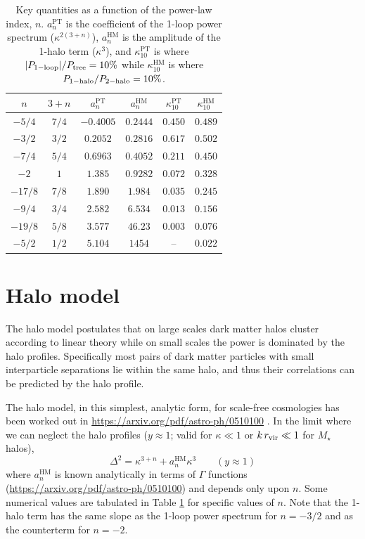 \documentclass{article}
\begin{document}
\begin{table}
    \centering
    \begin{tabular}{cccccc}
    $n$ & $3+n$ & $a_n^\mathrm{PT}$ & $a_n^\mathrm{HM}$ & $\kappa_{10}^\mathrm{PT}$ & $\kappa_{10}^\mathrm{HM}$ \\ \hline
    $-5/4$ & $7/4$ &$-0.4005$ & $0.2444$ & $0.450$ & $0.489$ \\
    $-3/2$ & $3/2$ & $0.2052$ & $0.2816$ & $0.617$ & $0.502$ \\
    $-7/4$ & $5/4$ & $0.6963$ & $0.4052$ & $0.211$ & $0.450$ \\
    $-2$   & $1$   &  $1.385$ & $0.9282$ & $0.072$ & $0.328$ \\
    $-17/8$& $7/8$ &  $1.890$ & $1.984$  & $0.035$ & $0.245$ \\
    $-9/4$ & $3/4$ &  $2.582$ & $6.534$  & $0.013$ & $0.156$ \\
    $-19/8$& $5/8$ &  $3.577$ & $46.23$  & $0.003$ & $0.076$ \\
    $-5/2$ & $1/2$ &  $5.104$ & $1454$   & --      & $0.022$ \\ \hline
    \end{tabular}
    \caption{Key quantities as a function of the power-law index, $n$.  $a_n^\mathrm{PT}$ is the coefficient of the 1-loop power spectrum ($\kappa^{2(3+n)}$), $a_n^\mathrm{HM}$ is the amplitude of the 1-halo term ($\kappa^3$), and $\kappa_{10}^\mathrm{PT}$ is where $|P_{\rm 1-loop}|/P_{\rm tree}=10\%$ while $\kappa_{10}^\mathrm{HM}$ is where $P_{\rm 1-halo}/P_{\rm 2-halo}=10\%$.}
    \label{tab:numbers}
\end{table}

\section{Halo model}

The halo model postulates that on large scales dark matter halos cluster according to linear theory while on small scales the power is dominated by the halo profiles. Specifically most pairs of dark matter particles with small interparticle separations lie within the same halo, and thus their correlations can be predicted by the halo profile.

The halo model, in this simplest, analytic form, for scale-free cosmologies has been worked out in \url{https://arxiv.org/pdf/astro-ph/0510100} .  In the limit where we can neglect the halo profiles ($y\approx 1$; valid for $\kappa\ll 1$ or $k\,r_{\rm vir}\ll 1$ for $M_\star$ halos),
\begin{equation}
  \Delta^2 = \kappa^{3+n} +  a_n^\mathrm{HM} \kappa^3
  \qquad (y \approx 1)
\end{equation}
where $a_n^\mathrm{HM}$ is known analytically in terms of $\Gamma$ functions (\url{https://arxiv.org/pdf/astro-ph/0510100}) and depends only upon $n$.  Some numerical values are tabulated in Table \ref{tab:numbers} for specific values of $n$.
Note that the 1-halo term has the same slope as the 1-loop power spectrum for $n=-3/2$ and as the counterterm for $n=-2$.
\end{document}
